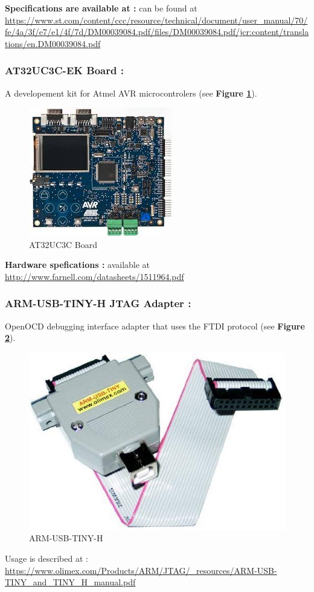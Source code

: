 \textbf{\color{red}Specifications are available at :} can be found at {\color{blue}\url{https://www.st.com/content/ccc/resource/technical/document/user_manual/70/fe/4a/3f/e7/e1/4f/7d/DM00039084.pdf/files/DM00039084.pdf/jcr:content/translations/en.DM00039084.pdf}}    	


\subsubsection{AT32UC3C-EK Board : }
A developement kit for Atmel AVR microcontrolers (see \textbf{Figure \ref{AT32UC3C Board}}).  
		\begin{figure}[H]
			\centering
        	\includegraphics[scale=0.40]{img/mean/avr32.jpeg}
        	\caption{AT32UC3C Board}
        	\label{AT32UC3C Board}
    	\end{figure}
    	
    	\textbf{\color{red}Hardware spefications :}  available at {\color{blue}\url{http://www.farnell.com/datasheets/1511964.pdf}}

\subsubsection{ARM-USB-TINY-H JTAG Adapter : }  OpenOCD debugging interface adapter that uses the FTDI protocol (see \textbf{Figure \ref{ARM-USB-TINY-H}}).
		\begin{figure}[H]
			\centering
        	\includegraphics[scale=0.25]{img/mean/arm-usb-tiny-h.jpg}
        	\caption{ARM-USB-TINY-H}
        	\label{ARM-USB-TINY-H}
    	\end{figure}
Usage is described at : {\color{blue}\url{https://www.olimex.com/Products/ARM/JTAG/_resources/ARM-USB-TINY_and_TINY_H_manual.pdf}}\\

